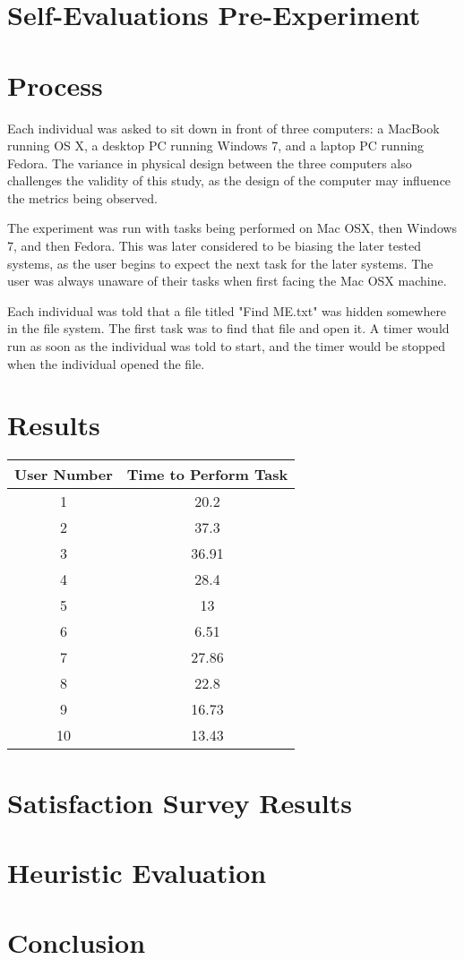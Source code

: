 \documentclass[11pt,a4paper]{report}
\begin{document}
\section{Self-Evaluations Pre-Experiment}

\section{Process}

Each individual was asked to sit down in front of three computers: a MacBook running OS X, a desktop PC running Windows 7, and a laptop PC running Fedora. The variance in physical design between the three computers also challenges the validity of this study, as the design of the computer may influence the metrics being observed. 

The experiment was run with tasks being performed on Mac OSX, then Windows 7, and then Fedora. This was later considered to be biasing the later tested systems, as the user begins to expect the next task for the later systems. The user was always unaware of their tasks when first facing the Mac OSX machine. 

Each individual was told that a file titled "Find ME.txt" was hidden somewhere in the file system. The first task was to find that file and open it. A timer would run as soon as the individual was told to start, and the timer would be stopped when the individual opened the file. 

\section{Results}

\begin{center}
    \begin{tabular}{| c | c |}
        \hline
        User Number & Time to Perform Task \\ \hline
        1 & 20.2 \\ \hline
        2 & 37.3 \\ \hline
        3 & 36.91 \\ \hline
        4 & 28.4 \\ \hline
        5 & 13 \\ \hline
        6 & 6.51 \\ \hline
        7 & 27.86 \\ \hline
        8 & 22.8 \\ \hline
        9 & 16.73 \\ \hline
        10 & 13.43 \\ 
        \hline
    \end{tabular}
\end{center}

\section{Satisfaction Survey Results}

\section{Heuristic Evaluation}

\section{Conclusion}
\end{document}
